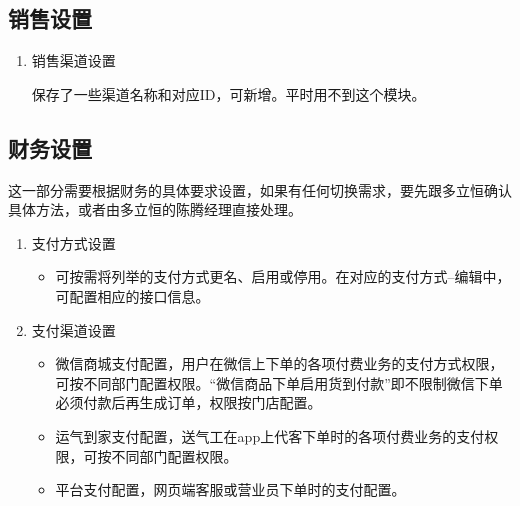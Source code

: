 \documentclass[UTF8]{ctexart}
\begin{document}
\subsection{销售设置}
\begin{enumerate}
	\item 销售渠道设置
	
	保存了一些渠道名称和对应ID，可新增。平时用不到这个模块。
\end{enumerate}


\subsection{财务设置}

这一部分需要根据财务的具体要求设置，如果有任何切换需求，要先跟多立恒确认具体方法，或者由多立恒的陈腾经理直接处理。

\begin{enumerate}
	\item 支付方式设置
	
	\begin{itemize}
		 
	\item 可按需将列举的支付方式更名、启用或停用。在对应的支付方式--编辑中，可配置相应的接口信息。

	\end{itemize}

	\item 支付渠道设置
	\begin{itemize}
		
		\item 微信商城支付配置，用户在微信上下单的各项付费业务的支付方式权限，可按不同部门配置权限。“微信商品下单启用货到付款”即不限制微信下单必须付款后再生成订单，权限按门店配置。
		
		\item 运气到家支付配置，送气工在app上代客下单时的各项付费业务的支付权限，可按不同部门配置权限。
		
		\item 平台支付配置，网页端客服或营业员下单时的支付配置。
		
	\end{itemize}



\end{enumerate}
\end{document}
